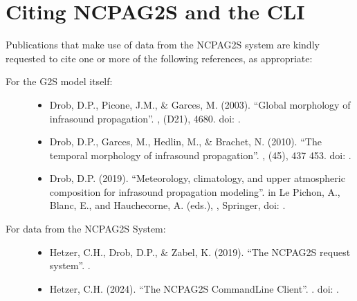 \documentclass[letterpaper,10pt,english]{sphinxmanual}
\begin{document}
\section{Citing NCPA\sphinxhyphen{}G2S and the CLI}
\label{\detokenize{authorship:citing-ncpa-g2s-and-the-cli}}
\sphinxAtStartPar
Publications that make use of data from the NCPA\sphinxhyphen{}G2S system are kindly requested to cite one or more of the following references, as appropriate:
\begin{description}
\item[{For the G2S model itself:}] \leavevmode\begin{itemize}
\item {} 
\sphinxAtStartPar
Drob, D.P., Picone, J.M., \& Garces, M. (2003). “Global morphology of infrasound propagation”. ,  (D21), 4680. doi: .

\item {} 
\sphinxAtStartPar
Drob, D.P., Garces, M., Hedlin, M., \& Brachet, N. (2010). “The temporal morphology of infrasound propagation”. ,  (4\sphinxhyphen{}5), 437 \textendash{} 453. doi: .

\item {} 
\sphinxAtStartPar
Drob, D.P. (2019). “Meteorology, climatology, and upper atmospheric composition for infrasound propagation modeling”. in Le Pichon, A., Blanc, E., and Hauchecorne, A. (eds.), , Springer, doi: .

\end{itemize}

\item[{For data from the NCPA\sphinxhyphen{}G2S System:}] \leavevmode\begin{itemize}
\item {} 
\sphinxAtStartPar
Hetzer, C.H., Drob, D.P., \& Zabel, K. (2019). “The NCPA\sphinxhyphen{}G2S request system”.  .

\item {} 
\sphinxAtStartPar
Hetzer, C.H. (2024). “The NCPAG2S Command\sphinxhyphen{}Line Client”.  .  doi: .

\end{itemize}

\end{description}
\end{document}
